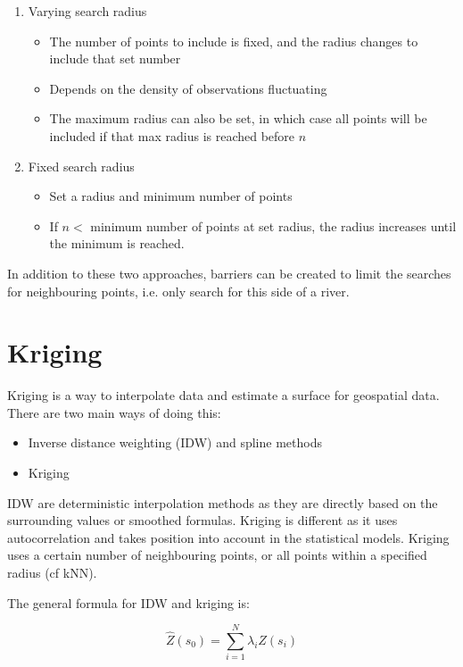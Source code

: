 \documentclass{article}
\begin{document}
\begin{enumerate}
    \item Varying search radius 
    \begin{itemize}
        \item The number of points to include is fixed, and the radius changes to include that set number
        \item Depends on the density of observations fluctuating
        \item The maximum radius can also be set, in which case all points will be included if that max radius is reached before $n$
    \end{itemize}
    \item Fixed search radius
    \begin{itemize}
        \item Set a radius and minimum number of points
        \item If $n <$ minimum number of points at set radius, the radius increases until the minimum is reached.
    \end{itemize}
\end{enumerate}

In addition to these two approaches, barriers can be created to limit the searches for neighbouring points, i.e. only search for this side of a river.

\section{Kriging}

Kriging is a way to interpolate data and estimate a surface for geospatial data.
There are two main ways of doing this:

\begin{itemize}
    \item Inverse distance weighting (IDW) and spline methods
    \item Kriging
\end{itemize}

IDW are deterministic interpolation methods as they are directly based on the surrounding values or smoothed formulas.
Kriging is different as it uses autocorrelation and takes position into account in the statistical models.
Kriging uses a certain number of neighbouring points, or all points within a specified radius (cf kNN).

The general formula for IDW and kriging is:

\[\hat{Z}(s_{0} )=\sum_{i=1}^{N}\lambda_{i} Z (s_{i})\]
\end{document}
